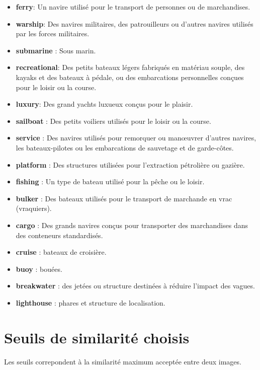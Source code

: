 \begin{itemize}
    \item \textbf{ferry}: Un navire utilisé pour le transport de personnes ou de marchandises.
    \item \textbf{warship}: Des navires militaires, des patrouilleurs ou d'autres navires utilisés par les forces militaires.
    \item \textbf{submarine} : Sous marin.
    \item \textbf{recreational}: Des petits bateaux légers fabriqués en matériau souple, des kayaks et des bateaux à pédale, ou des embarcations personnelles conçues pour le loisir ou la course.
    \item \textbf{luxury}: Des grand yachts luxueux conçus pour le plaisir.
    \item \textbf{sailboat} : Des petits voiliers utilisés pour le loisir ou la course.
    \item \textbf{service} : Des navires utilisés pour remorquer ou manœuvrer d'autres navires, les bateaux-pilotes ou les embarcations de sauvetage et de garde-côtes.
    \item \textbf{platform} : Des structures utilisées pour l'extraction pétrolière ou gazière.
    \item \textbf{fishing} : Un type de bateau utilisé pour la pêche ou le loisir.
    \item \textbf{bulker} : Des bateaux utilisés pour le transport de marchande en vrac (vraquiers).
    \item \textbf{cargo} : Des grands navires conçus pour transporter des marchandises dans des conteneurs standardisés.
    \item \textbf{cruise} : bateaux de croisière.
    \item \textbf{buoy} : bouées.
    \item \textbf{breakwater} : des jetées ou structure destinées à réduire l'impact des vagues.
    \item \textbf{lighthouse} : phares et structure de localisation.
\end{itemize}
\label{classes_annotations}

\pagebreak


\chapter{Seuils de similarité choisis}

Les seuils correpondent à la similarité maximum acceptée entre deux images.

